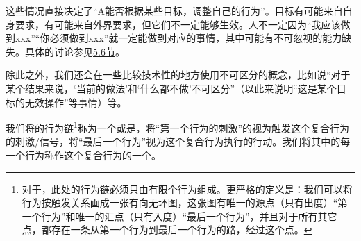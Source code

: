 \begin{explain}
\begin{itemize}
这些情况直接决定了“A能否根据某些目标，调整自己的行为”。目标有可能来自自身要求，有可能来自外界要求，但它们不一定能够生效。人不一定因为“我应该做到xxx”“你必须做到xxx”就一定能做到对应的事情，其中可能有不可忽视的能力缺失。具体的讨论参见\hyperref[sec:假性成长]{5.6节}。
\end{itemize}
\noindent 除此之外，我们还会在一些比较技术性的地方使用不可区分的概念，比如说“对于某个结果来说，‘当前的做法’和‘什么都不做’不可区分”（以此来说明“这是某个目标的无效操作”等事情）等。
\end{explain}

我们将的行为链\footnote{对于\rigorous，此处的行为链必须只由有限个行为组成。更严格的定义是：我们可以将行为按触发关系画成一张有向无环图，这张图有唯一的源点（只有出度）“第一个行为”和唯一的汇点（只有入度）“最后一个行为”，并且对于所有其它点，都存在一条从第一个行为到最后一个行为的路，经过这个点。}称为一个或是，将“第一个行为的刺激”的视为触发这个复合行为的刺激/信号，将“最后一个行为”视为这个复合行为执行的行动。我们将其中的每一个行为称作这个复合行为的一个。

